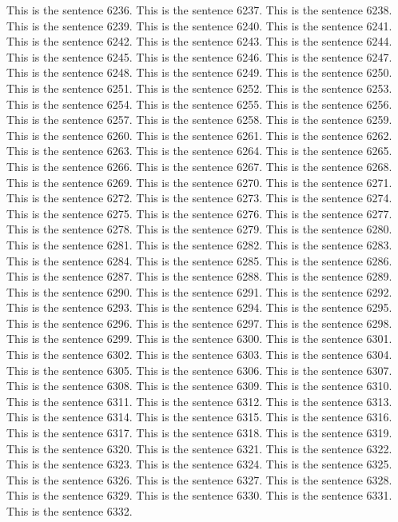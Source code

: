 \documentclass{article}
\begin{document}
This is the sentence 6236.
This is the sentence 6237.
This is the sentence 6238.
This is the sentence 6239.
This is the sentence 6240.
This is the sentence 6241.
This is the sentence 6242.
This is the sentence 6243.
This is the sentence 6244.
This is the sentence 6245.
This is the sentence 6246.
This is the sentence 6247.
This is the sentence 6248.
This is the sentence 6249.
This is the sentence 6250.
This is the sentence 6251.
This is the sentence 6252.
This is the sentence 6253.
This is the sentence 6254.
This is the sentence 6255.
This is the sentence 6256.
This is the sentence 6257.
This is the sentence 6258.
This is the sentence 6259.
This is the sentence 6260.
This is the sentence 6261.
This is the sentence 6262.
This is the sentence 6263.
This is the sentence 6264.
This is the sentence 6265.
This is the sentence 6266.
This is the sentence 6267.
This is the sentence 6268.
This is the sentence 6269.
This is the sentence 6270.
This is the sentence 6271.
This is the sentence 6272.
This is the sentence 6273.
This is the sentence 6274.
This is the sentence 6275.
This is the sentence 6276.
This is the sentence 6277.
This is the sentence 6278.
This is the sentence 6279.
This is the sentence 6280.
This is the sentence 6281.
This is the sentence 6282.
This is the sentence 6283.
This is the sentence 6284.
This is the sentence 6285.
This is the sentence 6286.
This is the sentence 6287.
This is the sentence 6288.
This is the sentence 6289.
This is the sentence 6290.
This is the sentence 6291.
This is the sentence 6292.
This is the sentence 6293.
This is the sentence 6294.
This is the sentence 6295.
This is the sentence 6296.
This is the sentence 6297.
This is the sentence 6298.
This is the sentence 6299.
This is the sentence 6300.
This is the sentence 6301.
This is the sentence 6302.
This is the sentence 6303.
This is the sentence 6304.
This is the sentence 6305.
This is the sentence 6306.
This is the sentence 6307.
This is the sentence 6308.
This is the sentence 6309.
This is the sentence 6310.
This is the sentence 6311.
This is the sentence 6312.
This is the sentence 6313.
This is the sentence 6314.
This is the sentence 6315.
This is the sentence 6316.
This is the sentence 6317.
This is the sentence 6318.
This is the sentence 6319.
This is the sentence 6320.
This is the sentence 6321.
This is the sentence 6322.
This is the sentence 6323.
This is the sentence 6324.
This is the sentence 6325.
This is the sentence 6326.
This is the sentence 6327.
This is the sentence 6328.
This is the sentence 6329.
This is the sentence 6330.
This is the sentence 6331.
This is the sentence 6332.
\end{document}
